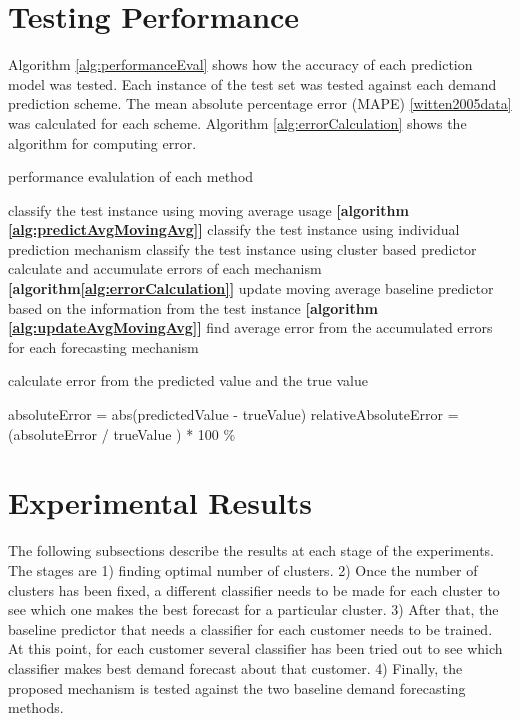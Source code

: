 \section{Testing Performance}
Algorithm \ref{alg:performanceEval} shows how the accuracy of each prediction model was tested. Each instance of the test set was tested against each demand prediction scheme. The mean absolute percentage error (MAPE) \ref{witten2005data} was calculated for each scheme. Algorithm \ref{alg:errorCalculation} shows the algorithm for computing error.
 
\begin{algorithm}
\caption{performance evalulation of each method}
\begin{algorithmic} [1]
    \STATE classify the test instance using moving average usage \textbf{[algorithm \ref{alg:predictAvgMovingAvg}]}
    \STATE classify the test instance using individual prediction mechanism
    \STATE classify the test instance using cluster based predictor
    \STATE calculate and accumulate errors of each mechanism \textbf{[algorithm\ref{alg:errorCalculation}]}
    \STATE update moving average baseline predictor based on the information from the test instance \textbf{[algorithm \ref{alg:updateAvgMovingAvg}]}
\ENDFOR 
\STATE find average error from the accumulated errors for each forecasting mechanism
\end{algorithmic}
\label{alg:performanceEval}
\end{algorithm}
\begin{algorithm} [!h]
\caption{calculate error from the predicted value and the true value}
\begin{algorithmic} [1]
\STATE absoluteError = abs(predictedValue - trueValue)
\STATE relativeAbsoluteError = (absoluteError / trueValue ) * 100 \%
\end{algorithmic}
\label{alg:errorCalculation}
\end{algorithm}

\section{Experimental Results}

The following subsections describe the results at each stage of the experiments. The stages are 1) finding optimal number of clusters. 2) Once the number of clusters has been fixed, a different classifier needs to be made for each cluster to see which one makes the best forecast for a particular cluster. 3) After that, the baseline predictor that needs a classifier for each customer needs to be trained. At this point, for each customer several classifier has been tried out to see which classifier makes best demand forecast about that customer. 4) Finally, the proposed mechanism is tested against the two baseline demand forecasting methods.

